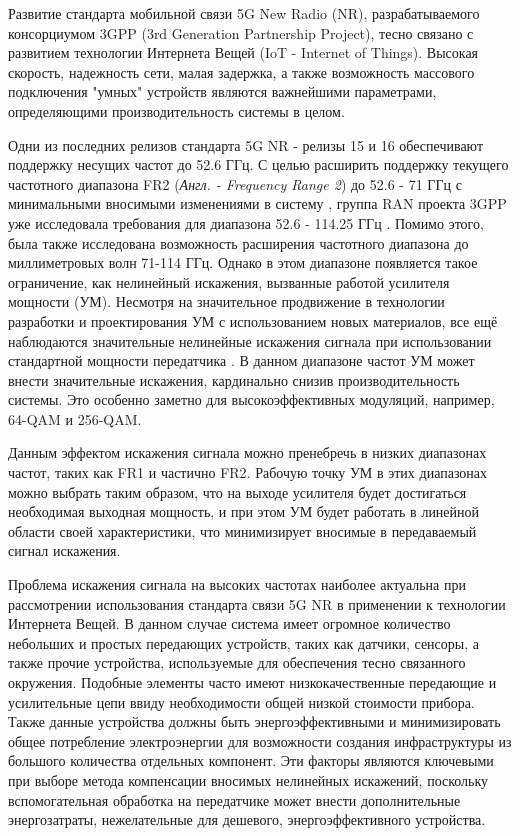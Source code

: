 \Introduction

Развитие стандарта мобильной связи 5G New Radio (NR), разрабатываемого консорциумом
3GPP (3rd Generation Partnership Project), тесно связано с развитием
технологии Интернета Вещей (IoT - Internet of Things). Высокая скорость,
надежность сети, малая задержка, а также возможность массового подключения
"умных" устройств являются важнейшими параметрами, определяющими
производительность системы в целом.

Одни из последних релизов стандарта 5G NR - релизы 15 и 16 обеспечивают
поддержку несущих частот до 52.6 ГГц. С целью расширить поддержку текущего
частотного диапазона FR2 (\textit{Англ. - Frequency Range 2}) до 52.6 - 71 ГГц с
минимальными вносимыми изменениями в систему \cite{intel193259}
\cite{qlcm193229}, группа RAN проекта 3GPP уже исследовала требования для
диапазона 52.6 - 114.25 ГГц \cite{3gpp.38.807}. Помимо этого, была также
исследована возможность расширения частотного диапазона до миллиметровых
волн 71-114 ГГц. Однако в этом диапазоне появляется такое ограничение, как
нелинейный искажения, вызванные работой усилителя мощности (УМ). Несмотря
на значительное продвижение в технологии разработки и проектирования УМ с
использованием новых материалов, все ещё наблюдаются значительные нелинейные
искажения сигнала при использовании стандартной мощности передатчика
\cite{zhang2021}. В данном диапазоне частот УМ может внести значительные
искажения, кардинально снизив производительность
системы. Это особенно заметно для высокоэффективных модуляций, например,
64-QAM и 256-QAM.

Данным эффектом искажения сигнала можно пренебречь в низких диапазонах
частот, таких как FR1 и частично FR2. Рабочую точку УМ в этих диапазонах
можно выбрать таким образом, что на выходе усилителя будет достигаться
необходимая выходная мощность, и при этом УМ будет работать в линейной
области своей характеристики, что минимизирует вносимые в передаваемый
сигнал искажения.

Проблема искажения сигнала на высоких частотах наиболее актуальна при
рассмотрении использования стандарта связи 5G NR в применении к технологии
Интернета Вещей. В данном случае система имеет огромное количество
небольших и простых передающих устройств, таких как датчики, сенсоры, а
также прочие устройства, используемые для обеспечения тесно
связанного окружения. Подобные элементы часто имеют низкокачественные
передающие и усилительные цепи ввиду необходимости общей низкой стоимости
прибора. Также данные устройства должны быть энергоэффективными и
минимизировать общее потребление электроэнергии для возможности создания
инфраструктуры из большого количества отдельных компонент.
Эти факторы являются ключевыми при выборе метода компенсации вносимых
нелинейных искажений, поскольку вспомогательная обработка на передатчике
может внести дополнительные энергозатраты, нежелательные для дешевого,
энергоэффективного устройства.


